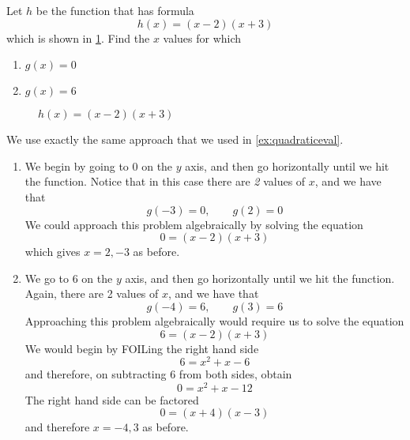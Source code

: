 \begin{myexample}
Let $h$ be the function that has formula
\[
	h(x) = (x-2)(x+3)
\]  
which is shown in \cref{fig:quadraticeval}. Find the $x$ values for which
\begin{multicols}{2}
	\begin{enumerate}
		\item $g(x)=0$
		\item $g(x)=6$
	\end{enumerate} 
\end{multicols}
\end{myexample}
\begin{figure}[!h]
	\centering
	\caption{$h(x)=(x-2)(x+3)$}
	\label{fig:quadraticeval}
\end{figure}
\begin{myProof}
	We use exactly the same approach that we used in \cref{ex:quadraticeval}. 
	\begin{enumerate}
		\item We begin by going to 0 on the $y$  axis, and then go horizontally until we hit the function. Notice that in 
		this case there are {\em 2} values of $x$, and we have that
		\[
			g(-3) = 0, \qquad g(2)=0
		\]
		We could approach this problem algebraically by solving the equation
		\[
			0 = (x-2)(x+3)
		\]
		which gives $x=2, -3$ as before.
		\item We go to 6 on the $y$ axis, and then go horizontally until we hit the function. Again, there are 2 values of $x$, 
		and we have that
		\[
			g(-4) = 6, \qquad g(3)=6
		\]
		Approaching this problem algebraically would require us to solve the equation
		\[
			6 = (x-2)(x+3)
		\]
		We would begin by FOILing the right hand side
		\[
			6 = x^2+x - 6
		\]  
		and therefore, on subtracting 6 from both sides, obtain
		\[
			0 = x^2 +x -12
		\]
		The right hand side can be factored
		\[
			0 = (x+4)(x-3)
		\]
		and therefore $x=-4,3$ as before.
	\end{enumerate} 
	{}
\end{myProof} 

